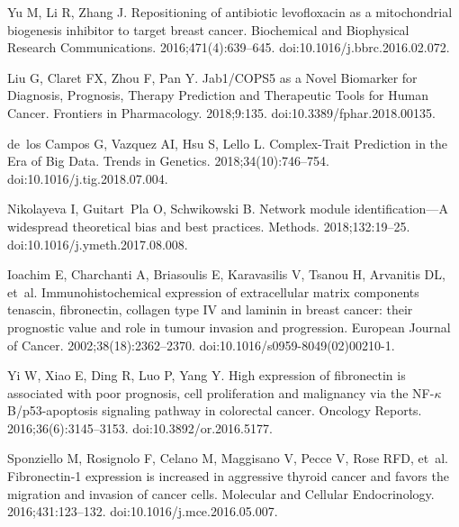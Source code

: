 \documentclass[10pt,letterpaper]{article}
\begin{document}
\begin{thebibliography}{10}
  Yu M, Li R, Zhang J.
  \newblock Repositioning of antibiotic levofloxacin as a mitochondrial
    biogenesis inhibitor to target breast cancer.
  \newblock Biochemical and Biophysical Research Communications.
    2016;471(4):639--645.
  \newblock doi:{10.1016/j.bbrc.2016.02.072}.
  
  Liu G, Claret FX, Zhou F, Pan Y.
  \newblock Jab1/{COPS}5 as a {Novel} {Biomarker} for {Diagnosis}, {Prognosis},
    {Therapy} {Prediction} and {Therapeutic} {Tools} for {Human} {Cancer}.
  \newblock Frontiers in Pharmacology. 2018;9:135.
  \newblock doi:{10.3389/fphar.2018.00135}.
  
  de~los Campos G, Vazquez AI, Hsu S, Lello L.
  \newblock Complex-{Trait} {Prediction} in the {Era} of {Big} {Data}.
  \newblock Trends in Genetics. 2018;34(10):746--754.
  \newblock doi:{10.1016/j.tig.2018.07.004}.
  
  Nikolayeva I, Guitart~Pla O, Schwikowski B.
  \newblock Network module identification—{A} widespread theoretical bias and
    best practices.
  \newblock Methods. 2018;132:19--25.
  \newblock doi:{10.1016/j.ymeth.2017.08.008}.
  
  Ioachim E, Charchanti A, Briasoulis E, Karavasilis V, Tsanou H, Arvanitis DL,
    et~al.
  \newblock Immunohistochemical expression of extracellular matrix components
    tenascin, fibronectin, collagen type {IV} and laminin in breast cancer: their
    prognostic value and role in tumour invasion and progression.
  \newblock European Journal of Cancer. 2002;38(18):2362--2370.
  \newblock doi:{10.1016/s0959-8049(02)00210-1}.
  
  Yi W, Xiao E, Ding R, Luo P, Yang Y.
  \newblock High expression of fibronectin is associated with poor prognosis,
    cell proliferation and malignancy via the {NF}-$\kappa$B/p53-apoptosis
    signaling pathway in colorectal cancer.
  \newblock Oncology Reports. 2016;36(6):3145--3153.
  \newblock doi:{10.3892/or.2016.5177}.
  
  Sponziello M, Rosignolo F, Celano M, Maggisano V, Pecce V, Rose RFD, et~al.
  \newblock Fibronectin-1 expression is increased in aggressive thyroid cancer
    and favors the migration and invasion of cancer cells.
  \newblock Molecular and Cellular Endocrinology. 2016;431:123--132.
  \newblock doi:{10.1016/j.mce.2016.05.007}.
  

\end{thebibliography}
\end{document}
